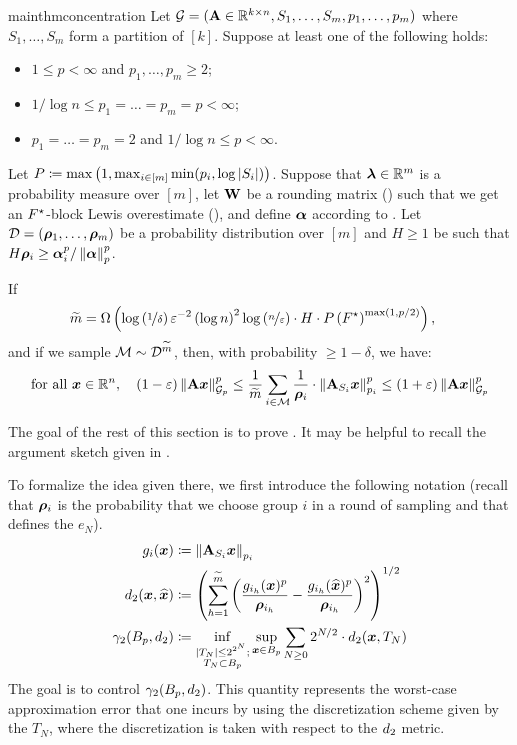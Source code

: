 \documentclass[11pt]{article}
\numberwithin{equation}{section}
\begin{document}
\begin{restatable}{mainthm}{concentration}
\label{thm:concentration}
Let $\mathcal{G} = (\mathbf{A} \in \mathbb{R}^{k \times n}, S_1,\dots,S_m, p_1,\dots,p_m)$ where $S_1,\dots,S_m$ form a partition of $[k]$. Suppose at least one of the following holds:
\begin{itemize}
    \item $1 \le p < \infty$ and $p_1,\dots,p_m \ge 2$;
    \item $1/\log n \le p_1 = \dots = p_m = p < \infty$;
    \item $p_1 = \dots = p_m = 2$ and $1/\log n \le p < \infty$.
\end{itemize}
Let $P \coloneqq \max\left(1, \max_{i \in [m]} \min(p_i,\log\left\lvert S_i \right\rvert)\right)$. Suppose that $\bm{\lambda} \in \mathbb{R}^m$ is a probability measure over $[m]$, let $\mathbf{W}$ be a rounding matrix () such that we get an $F^{\star}$-block Lewis overestimate (), and define $\bm{\alpha}$ according to . Let $\mathcal{D} = \left(\bm{\rho}_1,\dots,\bm{\rho}_m\right)$ be a probability distribution over $[m]$ and $H \ge 1$ be such that $H\bm{\rho}_i \ge \bm{\alpha}_i^p/\left\lVert \bm{\alpha} \right\rVert_p^p$.

If
\begin{align*}
    \widetilde{m} &= \Omega\left(\log\left(\nicefrac{1}{\delta}\right)\varepsilon^{-2}\left(\log n\right)^2\log\left(\nicefrac{n}{\varepsilon}\right) \cdot H \cdot P \left(F^{\star}\right)^{\max(1,p/2)}\right),
\end{align*}
and if we sample $\mathcal{M} \sim \mathcal{D}^{\widetilde{m}}$, then, with probability $\ge 1-\delta$, we have:
\begin{align*}
    \text{for all } \bm{x} \in \mathbb{R}^n,\quad (1-\varepsilon)\left\lVert \mathbf{A}\bm{x} \right\rVert_{\mathcal{G}_{p}}^p \le \frac{1}{\widetilde{m}}\sum_{i \in \mathcal{M}} \frac{1}{\bm{\rho}_i} \cdot \left\lVert \mathbf{A}_{S_i}\bm{x} \right\rVert_{p_i}^p \le (1+\varepsilon)\left\lVert \mathbf{A}\bm{x} \right\rVert_{\mathcal{G}_{p}}^p
\end{align*}
\end{restatable}
The goal of the rest of this section is to prove . It may be helpful to recall the argument sketch given in . 

To formalize the idea given there, we first introduce the following notation (recall that $\bm{\rho}_i$ is the probability that we choose group $i$ in a round of sampling and that  defines the $e_N$).
\begin{align}
    g_i(\bm{x}) &\coloneqq \left\lVert \mathbf{A}_{S_i}\bm{x} \right\rVert_{p_i}\label{eq:chaining_g_defn} \\
    d_2(\bm{x}, \widehat{\bm{x}}) &\coloneqq \left(\sum_{h=1}^{\widetilde{m}} \left(\frac{g_{i_h}(\bm{x})^p}{\bm{\rho}_{i_h}} - \frac{g_{i_h}(\widehat{\bm{x}})^p}{\bm{\rho}_{i_h}}\right)^2\right)^{1/2}\label{eq:chaining_dtwo_defn} \\
    \gamma_2(B_{p},d_2) &\coloneqq \inf_{\substack{\left\lvert T_N \right\rvert \le 2^{2^N};\\ T_N  \subset B_{p}}} \sup_{\bm{x} \in B_{p}} \sum_{N \ge 0} 2^{N/2} \cdot d_2(\bm{x},T_N)\label{eq:chaining_gamma2_defn}
\end{align}
The goal is to control $\gamma_2(B_p, d_2)$. This quantity represents the worst-case approximation error that one incurs by using the discretization scheme given by the $T_N$, where the discretization is taken with respect to the $d_2$ metric.
\end{document}
